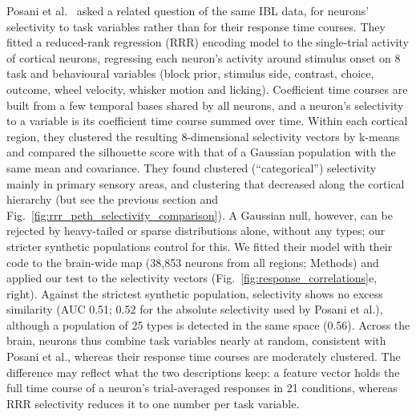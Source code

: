 \documentclass[10pt,lineno]{elife}
\begin{document}
Posani et al.\ \cite{posani2026rarely} asked a related question of the same IBL data, for neurons' selectivity to task variables rather than for their response time courses. They fitted a reduced-rank regression (RRR) encoding model to the single-trial activity of cortical neurons, regressing each neuron's activity around stimulus onset on 8 task and behavioural variables (block prior, stimulus side, contrast, choice, outcome, wheel velocity, whisker motion and licking). Coefficient time courses are built from a few temporal bases shared by all neurons, and a neuron's selectivity to a variable is its coefficient time course summed over time. Within each cortical region, they clustered the resulting 8-dimensional selectivity vectors by k-means and compared the silhouette score with that of a Gaussian population with the same mean and covariance. They found clustered (``categorical'') selectivity mainly in primary sensory areas, and clustering that decreased along the cortical hierarchy (but see the previous section and Fig.~\ref{fig:rrr_peth_selectivity_comparison}). A Gaussian null, however, can be rejected by heavy-tailed or sparse distributions alone, without any types; our stricter synthetic populations control for this. We fitted their model with their code to the brain-wide map (38,853 neurons from all regions; Methods) and applied our test to the selectivity vectors (Fig.~\ref{fig:response_correlations}e, right). Against the strictest synthetic population, selectivity shows no excess similarity (AUC 0.51; 0.52 for the absolute selectivity used by Posani et al.), although a population of 25 types is detected in the same space (0.56). Across the brain, neurons thus combine task variables nearly at random, consistent with Posani et al., whereas their response time courses are moderately clustered. The difference may reflect what the two descriptions keep: a feature vector holds the full time course of a neuron's trial-averaged responses in 21 conditions, whereas RRR selectivity reduces it to one number per task variable.
\end{document}

